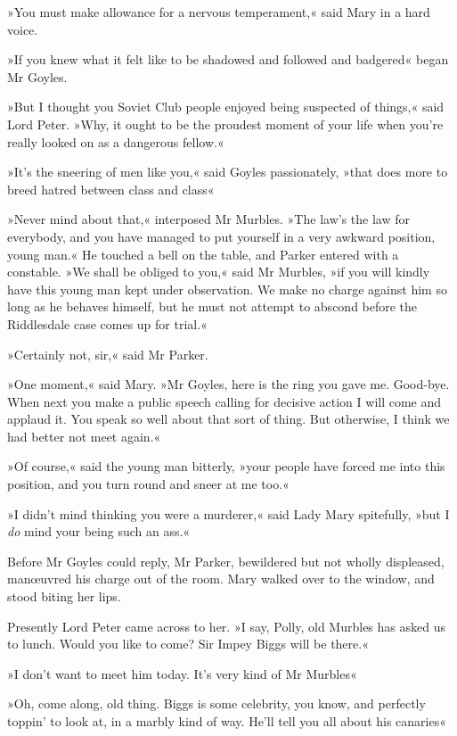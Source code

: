 »You must make allowance for a nervous temperament,« said Mary in a hard voice.

»If you knew what it felt like to be shadowed and followed and badgered\longdash« began Mr Goyles.

»But I thought you Soviet Club people enjoyed being suspected of things,« said Lord Peter. »Why, it ought to be the proudest moment of your life when you're really looked on as a dangerous fellow.«

»It's the sneering of men like you,« said Goyles passionately, »that does more to breed hatred between class and class\longdash«

»Never mind about that,« interposed Mr Murbles. »The law's the law for everybody, and you have managed to put yourself in a very awkward position, young man.« He touched a bell on the table, and Parker entered with a constable. »We shall be obliged to you,« said Mr Murbles, »if you will kindly have this young man kept under observation. We make no charge against him so long as he behaves himself, but he must not attempt to abscond before the Riddlesdale case comes up for trial.«

»Certainly not, sir,« said Mr Parker.

»One moment,« said Mary. »Mr Goyles, here is the ring you gave me.  Good-bye. When next you make a public speech calling for decisive action I will come and applaud it. You speak so well about that sort of thing. But otherwise, I think we had better not meet again.«

»Of course,« said the young man bitterly, »your people have forced me into this position, and you turn round and sneer at me too.«

»I didn't mind thinking you were a murderer,« said Lady Mary spitefully, »but I \textit{do} mind your being such an ass.«

Before Mr Goyles could reply, Mr Parker, bewildered but not wholly displeased, manœuvred his charge out of the room. Mary walked over to the window, and stood biting her lips.

Presently Lord Peter came across to her. »I say, Polly, old Murbles has asked us to lunch. Would you like to come? Sir Impey Biggs will be there.«

»I don't want to meet him today. It's very kind of Mr Murbles\longdash«

»Oh, come along, old thing. Biggs is some celebrity, you know, and perfectly toppin' to look at, in a marbly kind of way. He'll tell you all about his canaries\longdash«

